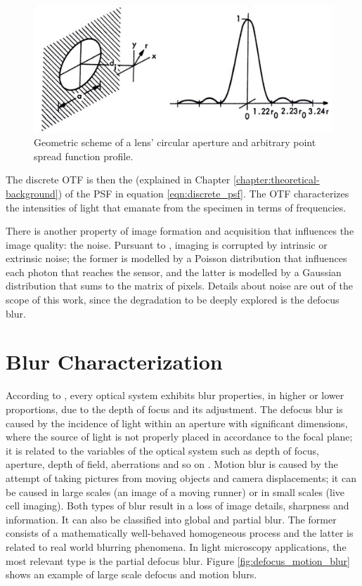 \begin{figure}[htb]
	\centering
	\caption{\label{fig:discrete_psf_scheme} Geometric scheme of a lens' circular aperture and arbitrary point spread function profile.} 
	\begin{center}
	    \includegraphics[scale=0.35]{images/discrete_psf_scheme.jpeg}
	\end{center}
	\centering
\end{figure}

The discrete OTF is then the  (explained in Chapter \ref{chapter:theoretical-background}) of the PSF in equation \ref{eqn:discrete_psf}. The OTF characterizes the intensities of light that emanate from the specimen in terms of frequencies. 

There is another property of image formation and acquisition that influences the image quality: the noise. Pursuant to , imaging is corrupted by intrinsic or extrinsic noise; the former is modelled by a Poisson distribution that influences each photon that reaches the sensor, and the latter is modelled by a Gaussian distribution that sums to the matrix of pixels. Details about noise are out of the scope of this work, since the degradation to be deeply explored is the defocus blur.

\section{Blur Characterization}


According to , every optical system exhibits blur properties, in higher or lower proportions, due to the depth of focus and its adjustment. The defocus blur is caused by the incidence of light within an aperture with significant dimensions, where the source of light is not properly placed in accordance to the focal plane; it is related to the variables of the optical system such as depth of focus, aperture, depth of field, aberrations and so on \cite{joshi2014defocus}. Motion blur is caused by the attempt of taking pictures from moving objects and camera displacements; it can be caused in large scales (an image of a moving runner) or in small scales (live cell imaging). Both types of blur result in a loss of image details, sharpness and information. It can also be classified into global and partial blur. The former consists of a mathematically well-behaved homogeneous process and the latter is related to real world blurring phenomena. In light microscopy applications, the most relevant type is the partial defocus blur. Figure \ref{fig:defocus_motion_blur} shows an example of large scale defocus and motion blurs.

